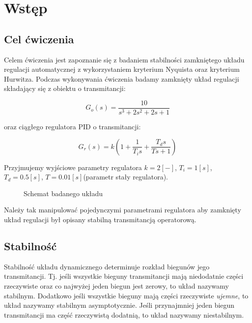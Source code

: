 \documentclass[12pt]{article}
\begin{document}
 
 

\section{Wstęp}

\subsection{Cel ćwiczenia} 

Celem ćwiczenia jest zapoznanie się z badaniem stabilności zamkniętego układu regulacji automatycznej z 
wykorzystaniem kryterium Nyquista oraz kryterium Hurwitza. Podczas wykonywania
ćwiczenia badamy zamknięty układ regulacji składający się z obiektu o
transmitancji:

\begin{equation}
	G_o(s)=\frac{10}{s^3+2s^2+2s+1}
\end{equation}

oraz ciągłego regulatora \textsc{PID} o transmitancji:

\begin{equation}
	G_r(s)=k\left(1+\frac{1}{T_is}+\frac{T_ds}{Ts+1}\right)
\end{equation}

Przyjmujemy wyjściowe parametry regulatora $k=2[-]$, $T_i=1[s]$, $T_d=0.5[s]$,
$T=0.01[s]$(parametr stały regulatora).

\begin{figure}[!htb]
	\begin{center}
		
	\end{center}
	\caption{Schemat badanego układu}
\end{figure}

Należy tak manipulować pojedynczymi parametrami regulatora aby zamknięty układ
regulacji był opisany stabilną transmitancją operatorową.

\subsection{Stabilność}

Stabilność układu dynamicznego determinuje rozkład biegunów jego transmitancji.
Tj. jeśli wszystkie bieguny transmitancji mają niedodatnie części rzeczywiste
oraz co najwyżej jeden biegun jest zerowy, to układ nazywamy stabilnym.
Dodatkowo jeśli wszystkie bieguny mają części rzeczywiste \textit{ujemne}, to
układ nazywamy stabilnym asymptotycznie. Jeśli przynajmniej jeden biegun transmitancji ma część
rzeczywistą dodatnią, to układ nazywamy niestabilnym.
\end{document}
